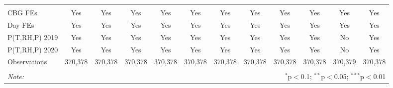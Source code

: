 \begin{table}[!htbp]
\begin{tabular}{@{\extracolsep{5pt}}lccccccccccc}
\hline \\[-1.8ex] 
CBG FEs & Yes & Yes & Yes & Yes & Yes & Yes & Yes & Yes & Yes & Yes & Yes \\ 
Day FEs & Yes & Yes & Yes & Yes & Yes & Yes & Yes & Yes & Yes & Yes & Yes \\ 
P(T,RH,P) 2019 & Yes & Yes & Yes & Yes & Yes & Yes & Yes & Yes & Yes & No & Yes \\ 
P(T,RH,P) 2020 & Yes & Yes & Yes & Yes & Yes & Yes & Yes & Yes & Yes & No & Yes \\ 
Observations & 370,378 & 370,378 & 370,378 & 370,378 & 370,378 & 370,378 & 370,378 & 370,378 & 370,378 & 370,379 & 370,378 \\ 
\hline 
\hline \\[-1.8ex] 
\textit{Note:}  & \multicolumn{11}{r}{$^{*}$p$<$0.1; $^{**}$p$<$0.05; $^{***}$p$<$0.01} \\ 
\end{tabular} 
\end{table} 
